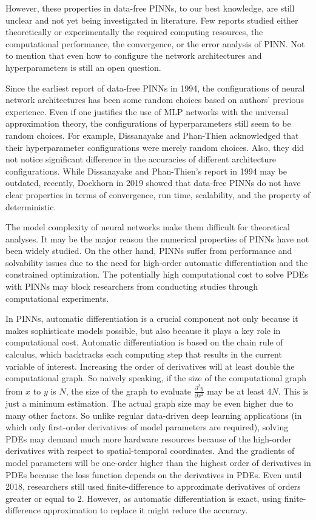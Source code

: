 However, these properties in data-free PINNs, to our best knowledge, are still unclear and not yet being investigated in literature.
Few reports studied either theoretically or experimentally the required computing resources, the computational performance, the convergence, or the error analysis of PINN.
Not to mention that even how to configure the network architectures and hyperparameters is still an open question. 

Since the earliest report of data-free PINNs in 1994, the configurations of neural network architectures has been some random choices based on authors' previous experience.
Even if one justifies the use of MLP networks with the universal approximation theory, the configurations of hyperparameters still seem to be random choices.
For example, Dissanayake and Phan-Thien acknowledged that their hyperparameter configurations were merely random choices.
Also, they did not notice significant difference in the accuracies of different architecture configurations.
While Dissanayake and Phan-Thien's report in 1994 may be outdated, recently, Dockhorn in 2019 \cite{dockhorn_discussion_2019} showed that data-free PINNs do not have clear properties in terms of convergence, run time, scalability, and the property of deterministic.

The model complexity of neural networks make them difficult for theoretical analyses.
It may be the major reason the numerical properties of PINNs have not been widely studied.
On the other hand, PINNs suffer from performance and solvability issues due to the need for high-order automatic differentiation and the constrained optimization.
The potentially high computational cost to solve PDEs with PINNs may block researchers from conducting studies through computational experiments.

In PINNs, automatic differentiation is a crucial component not only because it makes sophisticate models possible, but also because it plays a key role in computational cost.
Automatic differentiation is based on the chain rule of calculus, which backtracks each computing step that results in the current variable of interest.
Increasing the order of derivatives will at least double the computational graph.
So naively speaking, if the size of the computational graph from $x$ to $y$ is $N$, the size of the graph to evaluate $\frac{\partial^2 y}{\partial x^2}$ may be at least $4N$.
This is just a minimum estimation.
The actual graph size may be even higher due to many other factors.
So unlike regular data-driven deep learning applications (in which only first-order derivatives of model parameters are required), solving PDEs may demand much more hardware resources because of the high-order derivatives with respect to spatial-temporal coordinates.
And the gradients of model parameters will be one-order higher than the highest order of derivatives in PDEs because the loss function depends on the derivatives in PDEs. 
Even until 2018, researchers \cite{sirignano_dgm:_2018} still used finite-difference to approximate derivatives of orders greater or equal to $2$.
However, as automatic differentiation is exact, using finite-difference approximation to replace it might reduce the accuracy.

